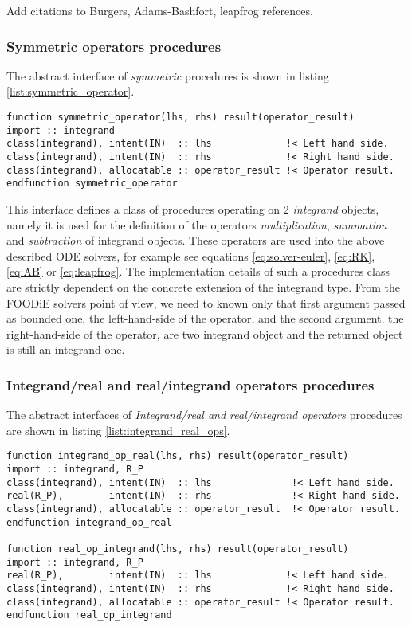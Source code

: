 \documentclass[pdftex,preprint,3p,times,numbers]{elsarticle}
\begin{document}
{\color{red} Add citations to Burgers, Adams-Bashfort, leapfrog references.}

\subsubsection{Symmetric operators procedures}

The abstract interface of \emph{symmetric} procedures is shown in listing \ref{list:symmetric_operator}.

\begin{lstlisting}[firstnumber=1,style=code,caption={symmetric operator procedure interface},label={list:symmetric_operator}]
function symmetric_operator(lhs, rhs) result(operator_result)
import :: integrand
class(integrand), intent(IN)  :: lhs             !< Left hand side.
class(integrand), intent(IN)  :: rhs             !< Right hand side.
class(integrand), allocatable :: operator_result !< Operator result.
endfunction symmetric_operator
\end{lstlisting}

This interface defines a class of procedures operating on 2 \emph{integrand} objects, namely it is used for the definition of the operators \emph{multiplication}, \emph{summation} and \emph{subtraction} of integrand objects. These operators are used into the above described ODE solvers, for example see equations \ref{eq:solver-euler}, \ref{eq:RK}, \ref{eq:AB} or \ref{eq:leapfrog}. The implementation details of such a procedures class are strictly dependent on the concrete extension of the integrand type. From the FOODiE solvers point of view, we need to known only that first argument passed as bounded one, the left-hand-side of the operator, and the second argument, the right-hand-side of the operator, are two integrand object and the returned object is still an integrand one.

\subsubsection{Integrand/real and real/integrand operators procedures}

The abstract interfaces of \emph{Integrand/real and real/integrand operators} procedures are shown in listing \ref{list:integrand_real_ops}.

\begin{lstlisting}[firstnumber=1,style=code,caption={Integrand/real and real/integrand operators procedure interfaces},label={list:integrand_real_ops}]
function integrand_op_real(lhs, rhs) result(operator_result)
import :: integrand, R_P
class(integrand), intent(IN)  :: lhs              !< Left hand side.
real(R_P),        intent(IN)  :: rhs              !< Right hand side.
class(integrand), allocatable :: operator_result  !< Operator result.
endfunction integrand_op_real

function real_op_integrand(lhs, rhs) result(operator_result)
import :: integrand, R_P
real(R_P),        intent(IN)  :: lhs             !< Left hand side.
class(integrand), intent(IN)  :: rhs             !< Right hand side.
class(integrand), allocatable :: operator_result !< Operator result.
endfunction real_op_integrand
\end{lstlisting}
\end{document}
